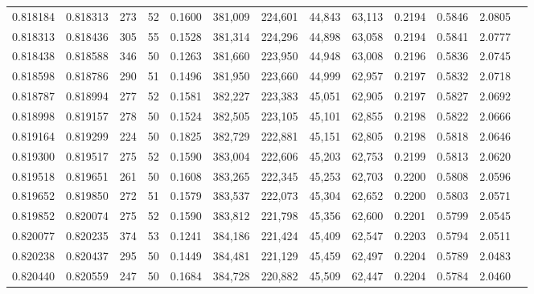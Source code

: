 \begin{tabular}{rrrrrrrrrrrrr}
0.818184 & 0.818313 &   273 &  52 &                                     0.1600 & 381,009 & 224,601 &  44,843 &  63,113 & 0.2194 & 0.5846 & 2.0805 \\
0.818313 & 0.818436 &   305 &  55 &                                     0.1528 & 381,314 & 224,296 &  44,898 &  63,058 & 0.2194 & 0.5841 & 2.0777 \\
0.818438 & 0.818588 &   346 &  50 &                                     0.1263 & 381,660 & 223,950 &  44,948 &  63,008 & 0.2196 & 0.5836 & 2.0745 \\
0.818598 & 0.818786 &   290 &  51 &                                     0.1496 & 381,950 & 223,660 &  44,999 &  62,957 & 0.2197 & 0.5832 & 2.0718 \\
0.818787 & 0.818994 &   277 &  52 &                                     0.1581 & 382,227 & 223,383 &  45,051 &  62,905 & 0.2197 & 0.5827 & 2.0692 \\
0.818998 & 0.819157 &   278 &  50 &                                     0.1524 & 382,505 & 223,105 &  45,101 &  62,855 & 0.2198 & 0.5822 & 2.0666 \\
0.819164 & 0.819299 &   224 &  50 &                                     0.1825 & 382,729 & 222,881 &  45,151 &  62,805 & 0.2198 & 0.5818 & 2.0646 \\
0.819300 & 0.819517 &   275 &  52 &                                     0.1590 & 383,004 & 222,606 &  45,203 &  62,753 & 0.2199 & 0.5813 & 2.0620 \\
0.819518 & 0.819651 &   261 &  50 &                                     0.1608 & 383,265 & 222,345 &  45,253 &  62,703 & 0.2200 & 0.5808 & 2.0596 \\
0.819652 & 0.819850 &   272 &  51 &                                     0.1579 & 383,537 & 222,073 &  45,304 &  62,652 & 0.2200 & 0.5803 & 2.0571 \\
0.819852 & 0.820074 &   275 &  52 &                                     0.1590 & 383,812 & 221,798 &  45,356 &  62,600 & 0.2201 & 0.5799 & 2.0545 \\
0.820077 & 0.820235 &   374 &  53 &                                     0.1241 & 384,186 & 221,424 &  45,409 &  62,547 & 0.2203 & 0.5794 & 2.0511 \\
0.820238 & 0.820437 &   295 &  50 &                                     0.1449 & 384,481 & 221,129 &  45,459 &  62,497 & 0.2204 & 0.5789 & 2.0483 \\
0.820440 & 0.820559 &   247 &  50 &                                     0.1684 & 384,728 & 220,882 &  45,509 &  62,447 & 0.2204 & 0.5784 & 2.0460 \\

\end{tabular}
